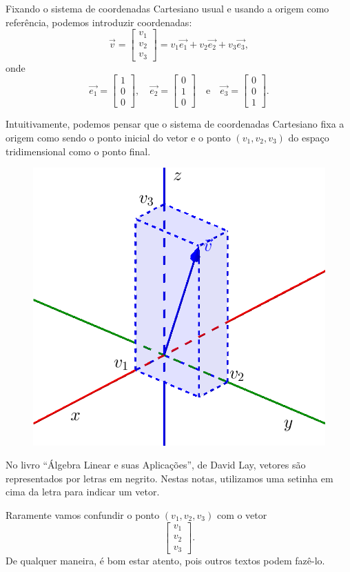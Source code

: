 Fixando o sistema de coordenadas Cartesiano usual e usando a origem como referência, podemos introduzir coordenadas:
\begin{equation}
\vec{v} =
\left[
  \begin{array}{c}
    v_1 \\
    v_2 \\
    v_3
  \end{array}
\right]
= v_1 \vec{e_1} + v_2 \vec{e_2} + v_3 \vec{e_3},
\end{equation} onde
\begin{equation}
\vec{e_1} =
\left[
  \begin{array}{c}
    1 \\
    0 \\
    0
  \end{array}
\right], \quad
\vec{e_2} =
\left[
  \begin{array}{c}
    0 \\
    1 \\
    0
  \end{array}
\right] \quad  \text{e} \quad
\vec{e_3} =
\left[
  \begin{array}{c}
    0 \\
    0 \\
    1
  \end{array}
\right].
\end{equation} 


\noindent Intuitivamente, podemos pensar que o sistema de coordenadas Cartesiano fixa a origem como sendo o ponto inicial do vetor e o ponto $(v_1, v_2, v_3)$ do espaço tridimensional como o ponto final. 

\begin{figure}[h!]
\begin{center}
\includegraphics[width=0.2\linewidth]{Semana02/semana02-coord}
\end{center}
\end{figure}

No livro ``Álgebra Linear e suas Aplicações'', de David Lay, vetores são representados por letras em negrito. Nestas notas, utilizamos uma setinha em cima da letra para indicar um vetor.

Raramente vamos confundir o ponto $(v_1, v_2, v_3)$ com o vetor
\begin{equation}
\left[
\begin{array}{c}
v_1 \\
v_2 \\
v_3
\end{array}
\right].
\end{equation} De qualquer maneira, é bom estar atento, pois outros textos podem fazê-lo.

